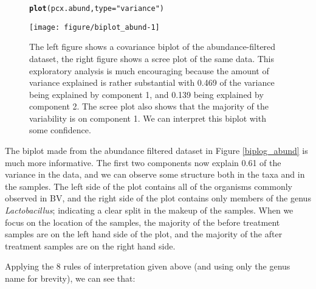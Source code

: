 \documentclass[11pt]{article}\usepackage[]{graphicx}\usepackage[]{color}
\makeatletter
\def\maxwidth{ %
  \ifdim\Gin@nat@width>\linewidth
    \linewidth
  \else
    \Gin@nat@width
  \fi
}
\newcommand{\hlstr}[1]{\textcolor[rgb]{0.192,0.494,0.8}{#1}}%
\newcommand{\hlstd}[1]{\textcolor[rgb]{0.345,0.345,0.345}{#1}}%
\newcommand{\hlkwc}[1]{\textcolor[rgb]{0.333,0.667,0.333}{#1}}%
\newcommand{\hlkwd}[1]{\textcolor[rgb]{0.737,0.353,0.396}{\textbf{#1}}}%
\newenvironment{kframe}{%
 \def\at@end@of@kframe{}%
 \ifinner\ifhmode%
  \def\at@end@of@kframe{\end{minipage}}%
  \begin{minipage}{\columnwidth}%
 \fi\fi%
 \def\FrameCommand##1{\hskip\@totalleftmargin \hskip-\fboxsep
 \colorbox{shadecolor}{##1}\hskip-\fboxsep
     \hskip-\linewidth \hskip-\@totalleftmargin \hskip\columnwidth}%
 \MakeFramed {\advance\hsize-\width
   \@totalleftmargin\z@ \linewidth\hsize
   \@setminipage}}%
 {\par\unskip\endMakeFramed%
 \at@end@of@kframe}
\newenvironment{knitrout}{}{} %
\makeatother
\begin{document}
\begin{figure}
\begin{center}
\begin{knitrout}
\begin{kframe}
\begin{alltt}
\hlkwd{plot}\hlstd{(pcx.abund,} \hlkwc{type}\hlstd{=}\hlstr{"variance"}\hlstd{)}
\end{alltt}
\end{kframe}
\texttt{[image: figure/biplot\_abund-1]} 

\end{knitrout}
\caption{The left figure shows a covariance biplot of the abundance-filtered dataset, the right figure shows a scree plot of the same data. This exploratory analysis is much  encouraging because  the amount of variance explained is  rather substantial with 0.469 of the variance being explained by component 1, and 0.139 being explained by component 2. The scree plot also shows that the majority of the variability is on component 1. We can  interpret this biplot with some confidence. }
\label{biplot_abund}
\end{center}
\end{figure}

The biplot made from the abundance filtered dataset in Figure \ref{biplog_abund} is much more informative. The first two components now explain  0.61 of the variance in the data, and we can observe some structure both in the taxa and in the samples. The left side of the plot contains all of the organisms commonly observed in BV, and the right side of the plot contains only members of the genus \emph{Lactobacillus}; indicating a clear split in the makeup of the samples. When we focus on the location of the samples,  the majority of the before treatment samples are on the left hand side of the plot, and the majority of the after treatment samples are on the right hand side. 

Applying the 8 rules of interpretation given above (and using only the genus name for brevity), we can see that:
\end{document}
